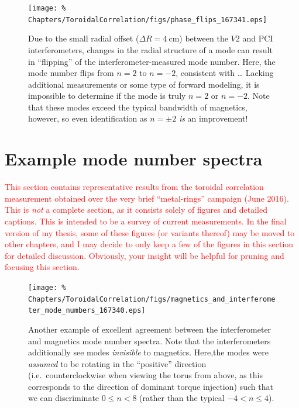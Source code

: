 \begin{figure}
  \centering
  \texttt{[image: \%
    Chapters/ToroidalCorrelation/figs/phase\_flips\_167341.eps]}
  \caption[Mode-number ``flipping'' due to the small radial offset
      between the $V2$ and PCI interferometers]{%
    Due to the small radial offset ($\Delta R = \SI{4}{\centi\meter}$)
    between the $V2$ and PCI interferometers,
    changes in the radial structure of a mode
    can result in ``flipping'' of the interferometer-measured mode number.
    Here, the mode number flips from $n = 2$ to $n = -2$,
    consistent with \ldots
    Lacking additional measurements or some type of forward modeling,
    it is impossible to determine if the mode is truly $n = 2$ or $n = -2$.
    Note that these modes exceed the typical bandwidth of magnetics, however,
    so even identification as $n = \pm 2$ \emph{is} an improvement!}
\label{fig:ToroidalCorrelation:mode_number_flips}
\end{figure}


\section{Example mode number spectra}
\label{sec:ToroidalCorrelation:survey_of_spectra}
\textcolor{red}{%
  This section contains representative results
  from the toroidal correlation measurement
  obtained over the very brief ``metal-rings'' campaign (June 2016).
  This is \emph{not} a complete section,
  as it consists solely of figures and detailed captions.
  This is intended to be a survey of current measurements.
  In the final version of my thesis,
  some of these figures (or variants thereof)
  may be moved to other chapters, and
  I may decide to only keep a few of the figures
  in this section for detailed discussion.
  Obviously, your insight will be helpful
  for pruning and focusing this section.
}

\begin{figure}[h!]
  \centering
  \texttt{[image: \%
    Chapters/ToroidalCorrelation/figs/magnetics\_and\_interferometer\_mode\_numbers\_167340.eps]}
  \caption[Another example of excellent agreement between the
      interferometer and magnetics mode number spectra]{%
    Another example of excellent agreement between the
    interferometer and magnetics mode number spectra. Note that
    the interferometers additionally see modes \emph{invisible} to magnetics.
    Here,the modes were \emph{assumed} to be rotating
    in the ``positive'' direction
    (i.e.\ counterclockwise when viewing the torus from above,
    as this corresponds to the direction of dominant torque injection)
    such that we can discriminate $0 \leq n < 8$
    (rather than the typical $-4 < n \leq 4$).}
\label{fig:ToroidalCorrelation:magnetics_corroboration_2}
\end{figure}

